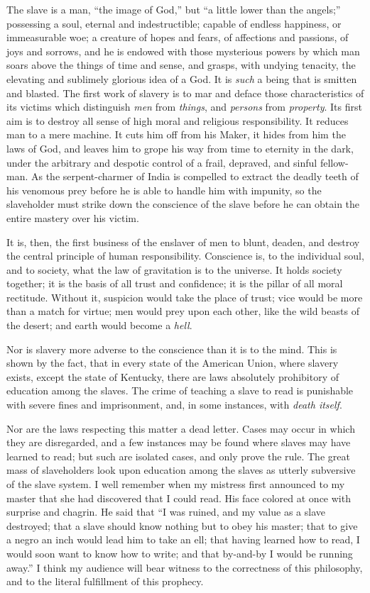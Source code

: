 The slave is a man, ``the image of God,'' but ``a little lower than the
angels;'' possessing a soul, eternal and indestructible; capable of
endless happiness, or immeasurable woe; a creature of hopes and fears,
of affections and passions, of joys and sorrows, and he is endowed with
those mysterious powers by which man soars above the things of time and
sense, and grasps, with undying tenacity, the elevating and sublimely
glorious idea of a God. It is \emph{such} a being that is smitten and
blasted. The first work of slavery is to mar and deface those
characteristics of its victims which distinguish \emph{men} from
\emph{things}, and \emph{persons} from \emph{property}. Its first aim is
to destroy all sense of high moral and religious responsibility. It
reduces man to a mere machine. It cuts him off from his Maker, it hides
from him the laws of God, and leaves him to grope his way from time to
eternity in the dark, under the arbitrary and despotic control of a
frail, depraved, and sinful fellow-man. As the serpent-charmer of India
is compelled to extract the deadly teeth of his venomous prey before he
is able to handle him with impunity, so the slaveholder must strike down
the conscience of the slave before he can obtain the entire mastery over
his victim.

It is, then, the first business of the enslaver of men to blunt, deaden,
and destroy the central principle of human responsibility. Conscience
is, to the individual soul, and to society, what the law of gravitation
is to the universe. It holds society together; it is the basis of all
trust and confidence; it is the pillar of all moral rectitude. Without
it, suspicion would take the place of trust; vice would be more than a
match for virtue; men would prey upon each other, like the wild beasts
of the desert; and earth would become a \emph{hell}.

Nor is slavery more adverse to the conscience than it is to the mind.
This is shown by the fact, that in every state of the American Union,
where slavery exists, except the state of Kentucky, there are laws
absolutely prohibitory of education among the slaves. {}The crime of
teaching a slave to read is punishable with severe fines and
imprisonment, and, in some instances, with \emph{death itself}.

Nor are the laws respecting this matter a dead letter. Cases may occur
in which they are disregarded, and a few instances may be found where
slaves may have learned to read; but such are isolated cases, and only
prove the rule. The great mass of slaveholders look upon education among
the slaves as utterly subversive of the slave system. I well remember
when my mistress first announced to my master that she had discovered
that I could read. His face colored at once with surprise and chagrin.
He said that ``I was ruined, and my value as a slave destroyed; that a
slave should know nothing but to obey his master; that to give a negro
an inch would lead him to take an ell; that having learned how to read,
I would soon want to know how to write; and that by-and-by I would be
running away.'' I think my audience will bear witness to the correctness
of this philosophy, and to the literal fulfillment of this prophecy.

